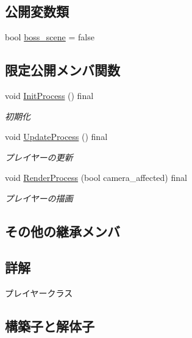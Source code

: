 \subsection*{公開変数類}
\begin{DoxyCompactItemize}
\item 
bool \mbox{\hyperlink{class_player_adf34c7a3a58c3f8e7f7201ed962a03f0}{boss\+\_\+scene}} = false
\end{DoxyCompactItemize}
\subsection*{限定公開メンバ関数}
\begin{DoxyCompactItemize}
\item 
void \mbox{\hyperlink{class_player_a1051f85c8bf18a256d275d1a1dee5da6}{Init\+Process}} () final
\begin{DoxyCompactList}\small\item\em 初期化 \end{DoxyCompactList}\item 
void \mbox{\hyperlink{class_player_ab8accc9b83b030f5313f1b4872a7e634}{Update\+Process}} () final
\begin{DoxyCompactList}\small\item\em プレイヤーの更新 \end{DoxyCompactList}\item 
void \mbox{\hyperlink{class_player_a8ac2e54fe5672d32186456b9735c02c3}{Render\+Process}} (bool camera\+\_\+affected) final
\begin{DoxyCompactList}\small\item\em プレイヤーの描画 \end{DoxyCompactList}\end{DoxyCompactItemize}
\subsection*{その他の継承メンバ}


\subsection{詳解}
プレイヤークラス 

\subsection{構築子と解体子}
\mbox{\label{class_player_affe0cc3cb714f6deb4e62f0c0d3f1fd8}} 
